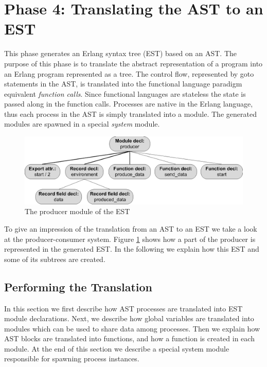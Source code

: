 \section{Phase 4: Translating the AST to an EST}
\label{sec:astest}

This phase generates an Erlang syntax tree (EST) based on an AST. The purpose of this phase is to translate the abstract representation of a program into an Erlang program represented as a tree. The control flow, represented by goto statements in the AST, is translated into the functional language paradigm equivalent \emph{function calls}. Since functional languages are stateless the state is passed along in the function calls. Processes are native in the Erlang language, thus each process in the AST is simply translated into a module. The generated modules are spawned in a special \emph{system} module.

\begin{figure}[b!]
\centering
\includegraphics[width=\textwidth]{translation/ast_to_est/graphics/producerest01.eps}
\caption{The producer module of the EST}
\label{fig:prodmoduledecl}
\end{figure}

To give an impression of the translation from an AST to an EST we take a look at the producer-consumer system. Figure \ref{fig:prodmoduledecl} shows how a part of the producer is represented in the generated EST. In the following we explain how this EST and some of its subtrees are created.

\subsection{Performing the Translation}
In this section we first describe how AST processes are translated into EST module declarations. Next, we describe how global variables are translated into modules which can be used to share data among processes. Then we explain how AST blocks are translated into functions, and how a  function is created in each module. At the end of this section we describe a special system module responsible for spawning process instances.

